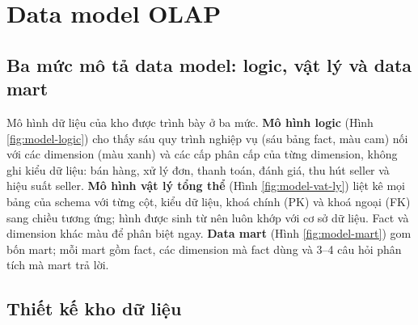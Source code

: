 \section{Data model OLAP}\label{sec:data-model}
\subsection{Ba mức mô tả data model: logic, vật lý và data mart}\label{sec:ba-hinh-model}
Mô hình dữ liệu của kho được trình bày ở ba mức. \textbf{Mô hình logic} (Hình \ref{fig:model-logic}) cho thấy sáu quy trình nghiệp vụ (sáu bảng fact, màu cam) nối với các dimension (màu xanh) và các cấp phân cấp của từng dimension, không ghi kiểu dữ liệu: bán hàng, xử lý đơn, thanh toán, đánh giá, thu hút seller và hiệu suất seller. \textbf{Mô hình vật lý tổng thể} (Hình \ref{fig:model-vat-ly}) liệt kê mọi bảng của schema  với từng cột, kiểu dữ liệu, khoá chính (PK) và khoá ngoại (FK) sang chiều tương ứng; hình được sinh từ  nên luôn khớp với cơ sở dữ liệu. Fact và dimension khác màu để phân biệt ngay. \textbf{Data mart} (Hình \ref{fig:model-mart}) gom bốn mart; mỗi mart gồm fact, các dimension mà fact dùng và 3--4 câu hỏi phân tích mà mart trả lời.
\subsection{Thiết kế kho dữ liệu}
